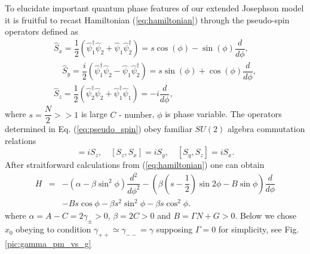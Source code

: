 \documentclass[aps, pre, preprint, groupedaddress, superscriptaddress, showkeys, showpacs] {revtex4-1}
\begin{document}
To elucidate important quantum phase features of our extended Josephson model it is fruitful to recast Hamiltonian (\ref{eq:hamiltonian}) through the pseudo-spin operators defined as
% 
\begin{subequations}
\begin{align}
\hat{S}_x = \dfrac{1}{2} (\hat{\psi}_1^\dag \hat{\psi}_2 + \hat{\psi}_1 \hat{\psi}_2^\dag) = s \cos(\phi) - \sin(\phi) \dfrac{d}{d \phi}, \\
\quad \hat{S}_y = \dfrac{i}{2} (\hat{\psi}_1^\dag \hat{\psi}_2 - \hat{\psi}_1 \hat{\psi}_2^\dag) = s \sin(\phi) + \cos(\phi) \dfrac{d}{d \phi}, \\
\hat{S}_z = \dfrac{1}{2} (\hat{\psi}_2^\dag \hat{\psi}_2 + \hat{\psi}_1^\dag \hat{\psi}_1) = -i\dfrac{d}{d \phi},
\end{align}
\label{eq:pseudo_spin}
\end{subequations}
%
where $s = \dfrac{N}{2} >> 1$ is large {\red $C$ - number}, $\phi$ is phase variable.
The operators determined in Eq. (\ref{eq:pseudo_spin}) obey familiar $SU(2)$ algebra commutation relations
%
\begin{equation}
[S_x, S_y] = iS_z, \quad[S_z, S_x] = iS_y, \quad[S_y, S_z] = iS_x.
\label{eq:commutation_relations}
\end{equation}
%
After straitforward calculations from (\ref{eq:hamiltonian}) one can obtain
%
\begin{equation}
\begin{array}{lcl}
H & = & -(\alpha - \beta \sin^2 \phi) \dfrac{d^2}{d \phi^2} - (\beta(s-\dfrac{1}{2})\sin{2\phi} - B\sin{\phi}) \dfrac{d}{d \phi} \\
&& - Bs \cos \phi - \beta s^2 \sin^2 \phi - \beta s \cos^2 \phi.
\end{array}
\label{eq:hamiltinian_s}
\end{equation}
%
where $\alpha = A - C = 2\gamma_{\pm} > 0$, $\beta = 2C > 0$ and $B = \Gamma N + G > 0$.
Below we chose $x_0$ obeying to condition $\gamma_{++} \simeq \gamma_{--} = \gamma$ supposing $\Gamma = 0$ for simplicity, see Fig. \ref{pic:gamma_pm_vs_g}
\end{document}
